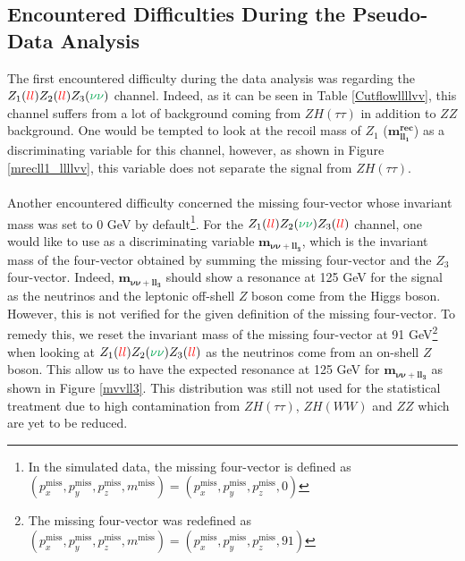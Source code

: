 \documentclass[a4paper,11pt]{article}
\begin{document}
	\subsection{Encountered Difficulties During the Pseudo-Data Analysis}
    The first encountered difficulty during the data analysis was regarding the $Z_1(\textcolor{red}{ll})Z_2(\textcolor{red}{ll})Z_3(\textcolor{Green}{\nu\nu})$ channel. Indeed, as it can be seen in Table \ref{Cutflowllllvv}, this channel suffers from a lot of background coming from $ZH(\tau\tau)$ in addition to $ZZ$ background. One would be tempted to look at the recoil mass of $Z_1$ ($\boldsymbol{m^{\mbox{rec}}_{ll_1}}$) as a discriminating variable for this channel, however, as shown in Figure \ref{mrecll1_llllvv}, this variable does not separate the signal from $ZH(\tau\tau)$.\\\\
    Another encountered difficulty concerned the missing four-vector whose invariant mass was set to 0 GeV by default\footnote{In the simulated data, the missing four-vector is defined as $(p^{\mbox{miss}}_x,p^{\mbox{miss}}_y,p^{\mbox{miss}}_z,m^{\mbox{miss}})=(p^{\mbox{miss}}_x,p^{\mbox{miss}}_y,p^{\mbox{miss}}_z,0)$}. For the $Z_1(\textcolor{red}{ll})Z_2(\textcolor{Green}{\nu\nu})Z_3(\textcolor{red}{ll})$ channel, one would like to use as a discriminating variable $\boldsymbol{m_{\nu\nu+ll_3}}$, which is the invariant mass of the four-vector obtained by summing the missing four-vector and the $Z_3$ four-vector. Indeed, $\boldsymbol{m_{\nu\nu+ll_3}}$ should show a resonance at 125 GeV for the signal as the neutrinos and the leptonic off-shell $Z$ boson come from the Higgs boson. However, this is not verified for the given definition of the missing four-vector. To remedy this, we reset the invariant mass of the missing four-vector at 91 GeV\footnote{The missing four-vector was redefined as $(p^{\mbox{miss}}_x,p^{\mbox{miss}}_y,p^{\mbox{miss}}_z,m^{\mbox{miss}})=(p^{\mbox{miss}}_x,p^{\mbox{miss}}_y,p^{\mbox{miss}}_z,91)$} when looking at $Z_1(\textcolor{red}{ll})Z_2(\textcolor{Green}{\nu\nu})Z_3(\textcolor{red}{ll})$ as the neutrinos come from an on-shell $Z$ boson. This allow us to have the expected resonance at 125 GeV for $\boldsymbol{m_{\nu\nu+ll_3}}$ as shown in Figure \ref{mvvll3}. This distribution was still not used for the statistical treatment due to high contamination from $ZH(\tau\tau)$, $ZH(WW)$ and $ZZ$ which are yet to be reduced.
\end{document}
